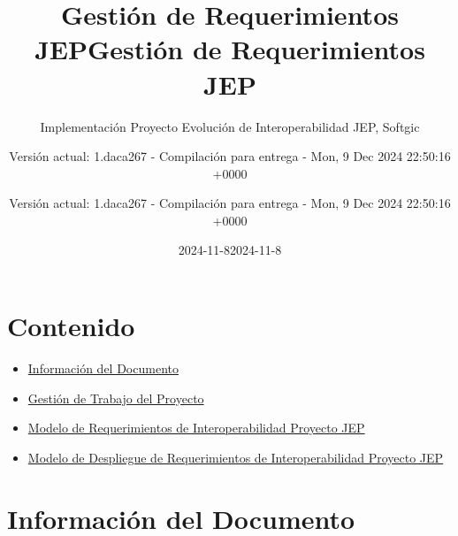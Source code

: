 \documentclass[
  paper=a4,
  ,captions=tableheading
]{scrartcl}
\title{Gestión de Requerimientos JEP}
\subtitle{Implementación Proyecto Evolución de Interoperabilidad JEP,
Softgic}
\author{Versión actual: 1.daca267 - Compilación para entrega - Mon, 9
Dec 2024 22:50:16 +0000}
\date{2024-11-8}
\title{Gestión de Requerimientos JEP}
\author{Versión actual: 1.daca267 - Compilación para entrega - Mon, 9
Dec 2024 22:50:16 +0000}
\date{2024-11-8}
\providecommand{\tightlist}{%
  \setlength{\itemsep}{0pt}\setlength{\parskip}{0pt}}
\begin{document}
\begin{titlepage}
\newcommand{\colorRule}[3][black]{\textcolor[HTML]{#1}{\rule{#2}{#3}}}
\end{titlepage}
\restoregeometry
{}




\section{Contenido}\label{sec:contenido}

\begin{itemize}
\tightlist
\item
  \hyperref[informaciuxf3n-del-documento]{Información del Documento}
\item
  \hyperref[gestiuxf3n-de-trabajo-del-proyecto]{Gestión de Trabajo del
  Proyecto}
\item
  \hyperref[modelo-de-requerimientos-de-interoperabilidad-proyecto-jep]{Modelo
  de Requerimientos de Interoperabilidad Proyecto JEP}
\item
  \hyperref[modelo-de-despliegue-de-requerimientos-de-interoperabilidad-proyecto-jep]{Modelo
  de Despliegue de Requerimientos de Interoperabilidad Proyecto JEP}
\end{itemize}

\newpage

\section{Información del
Documento}\label{sec:informaciuxf3n-del-documento}
\end{document}
